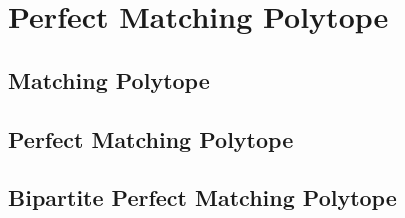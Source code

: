 \chapter{Perfect Matching Polytope}
\section{Matching Polytope}
\section{Perfect Matching Polytope}
\section{Bipartite Perfect Matching Polytope}
